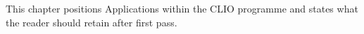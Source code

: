 This chapter positions Applications within the CLIO programme and states what the reader should retain after first pass.
